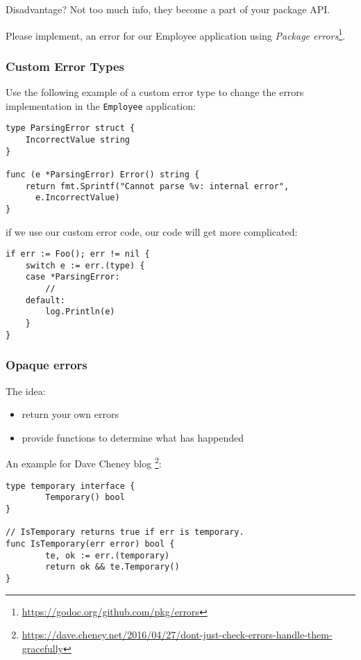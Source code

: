\documentclass[11pt, letterpaper]{article}
\begin{document}
Disadvantage? Not too much info, they become a part of your package {\small API}.

\bigskip

Please implement, an error for our Employee application using \emph{Package errors}\footnote{\href{https://godoc.org/github.com/pkg/errors}{https://godoc.org/github.com/pkg/errors}}.

\subsubsection{Custom Error Types}

Use the following example of a custom error type to change the errors implementation in the \verb|Employee| application:

\begin{verbatim}
type ParsingError struct {
    IncorrectValue string
}

func (e *ParsingError) Error() string {
    return fmt.Sprintf("Cannot parse %v: internal error",
      e.IncorrectValue)
}
\end{verbatim}

if we use our custom error code, our code will get more complicated:

\begin{verbatim}
if err := Foo(); err != nil {
    switch e := err.(type) {
    case *ParsingError:
        // 
    default:
        log.Println(e)
    }
}
\end{verbatim}

\bigskip

\subsubsection{Opaque errors}

The idea:

\begin{itemize}
\item return your own errors
\item provide functions to determine what has happended
\end{itemize}

An example for Dave Cheney blog \footnote{\href{https://dave.cheney.net/2016/04/27/dont-just-check-errors-handle-them-gracefully}{https://dave.cheney.net/2016/04/27/dont-just-check-errors-handle-them-gracefully}}:

\begin{verbatim}
type temporary interface {
        Temporary() bool
}
 
// IsTemporary returns true if err is temporary.
func IsTemporary(err error) bool {
        te, ok := err.(temporary)
        return ok && te.Temporary()
}
\end{verbatim}
\end{document}
